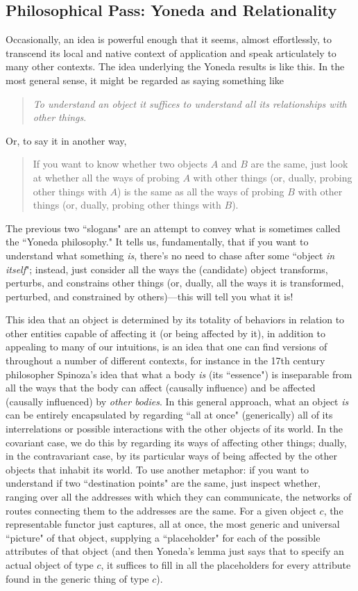 \documentclass[11pt]{book}
\theoremstyle{definition}
\theoremstyle{definition}
\theoremstyle{definition}
\theoremstyle{theorem}
\theoremstyle{definition}
\begin{document}
\subsection{Philosophical Pass: Yoneda and Relationality}
Occasionally, an idea is powerful enough that it seems, almost effortlessly, to transcend its local and native context of application and speak articulately to many other contexts. The idea underlying the Yoneda results is like this. In the most general sense, it might be regarded as saying something like  
\begin{quote} 
	\textit{To understand an object it suffices to understand all its relationships with other things}.
\end{quote} 
Or, to say it in another way,
\begin{quote}
	If you want to know whether two objects $A$ and $B$ are the same, just look at whether all the ways of probing $A$ with other things (or, dually, probing other things with $A$) is the same as all the ways of probing $B$ with other things (or, dually, probing other things with $B$).
\end{quote}
The previous two ``slogans" are an attempt to convey what is sometimes called the ``Yoneda philosophy."  It tells us, fundamentally, that if you want to understand what something \textit{is}, there's no need to chase after some ``object \textit{in itself}"; instead, just consider all the ways the (candidate) object transforms, perturbs, and constrains other things (or, dually, all the ways it is transformed, perturbed, and constrained by others)---this will tell you what it is! \par 
This idea that an object is determined by its totality of behaviors in relation to other entities capable of affecting it (or being affected by it), in addition to appealing to many of our intuitions, is an idea that one can find versions of throughout a number of different contexts, for instance in the 17th century philosopher Spinoza's idea that what a body \textit{is} (its ``essence") is inseparable from all the ways that the body can affect (causally influence) and be affected (causally influenced) by \textit{other bodies}. In this general approach, what an object \textit{is} can be entirely encapsulated by regarding ``all at once" (generically) all of its interrelations or possible interactions with the other objects of its world. In the covariant case, we do this by regarding its ways of affecting other things; dually, in the contravariant case, by its particular ways of being affected by the other objects that inhabit its world. To use another metaphor: if you want to understand if two ``destination points" are the same, just inspect whether, ranging over all the addresses with which they can communicate, the networks of routes connecting them to the addresses are the same. For a given object $c$, the representable functor just captures, all at once, the most generic and universal ``picture" of that object, supplying a ``placeholder" for each of the possible attributes of that object (and then Yoneda's lemma just says that to specify an actual object of type $c$, it suffices to fill in all the placeholders for every attribute found in the generic thing of type $c$).\par
\end{document}
